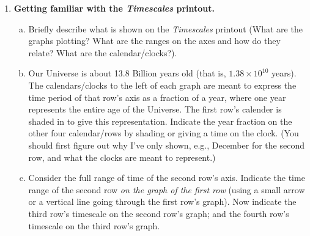 \documentclass[12pt]{article}
\begin{document}
\begin{enumerate}

\item {\bf Getting familiar with the {\em Timescales} printout.}  
	\begin{enumerate}[(a)]
	\item Briefly describe what is shown on the {\em Timescales} printout (What are the graphs plotting? What are the ranges on the axes and how do they relate? What are the calendar/clocks?).
	\item Our Universe is about 13.8 Billion years old (that is, $1.38 \times 10^{10}$ years).  The calendars/clocks to the left of each graph are meant to express the time period of that row's axis as a fraction of a year, where one year represents the entire age of the Universe.  The first row's calender is shaded in to give this representation.  Indicate the year fraction on the other four calendar/rows by shading or giving a time on the clock.  (You should first figure out why I've only shown, e.g., December for the second row, and what the clocks are meant to represent.)
	\item Consider the full range of time of the second row's axis.  Indicate the time range of the second row {\em on the graph of the first row} (using a small arrow or a vertical line going through the first row's graph).  Now indicate the third row's timescale on the second row's graph; and the fourth row's timescale on the third row's graph.
	\end{enumerate}


\end{enumerate}
\end{document}
